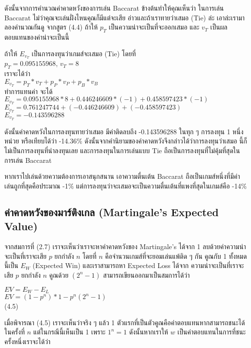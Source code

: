 \documentclass{article}
\begin{document}
ดังนั้นจากการคำนวณค่าคาดหวังของการเล่น Baccarat ข้างต้นทำให้คุณเห็นว่า ในการเล่น Baccarat ไม่ว่าคุณจะเล่นฝั่งไหนคุณก็มีแต่จะเสีย อ่าวและถ้าเราทายว่าเสมอ (Tie) ล่ะ เอาล่ะเรามาลองคำนวณกันดู จากสูตร (4.4) ถ้าให้ $p_T$ เป็นความน่าจะเป็นที่จะออกเสมอ และ $v_T$ เป็นผลตอบแทนของค่าน่าจะเป็นนี้

\begin{center}
ถ้าให้ $E_{v_T}$ เป็นการลงทุนว่าเกมส์จะเสมอ (Tie) โดยที่\\
$p_T=0.095155968$, $v_T=8$\\
เราจะได้ว่า\\
$E_{v_T}=p_T*v_T+p_P*v_P+p_B*v_B$\\
ทำการแทนค่า จะได้\\
$E_{v_T}=0.095155968*8+0.446246609*(-1)+0.458597423*(-1)$\\
$E_{v_T}=0.761247744+(-0.446246609)+(-0.458597423)$\\
$E_{v_T}=-0.143596288$\\
\end{center}

ดังนั้นค่าคาดหวังในการลงทุนทายว่าเสมอ มีค่าติดลบถึง -0.143596288 ในทุก ๆ การลงทุน 1 หนึ่งหน่วย หรือเทียบได้ว่า -14.36\% ดังนั้นจากคำนิยามของค่าคาดหวังจึงกล่าวได้ว่าการลงทุนว่าเสมอ นี้ก็ไม่เป็นการลงทุนที่น่าลงทุนเลย และการลงทุนในการเล่นแบบ Tie ถือเป็นการลงทุนที่ไม่คุ้มที่สุดในการเล่น Baccarat 

หากเราไปเล่นด้วยความต้องการเอาสนุกสนาน เอาความตื่นเต้น Baccarat ถือเป็นเกมส์หนึ่งที่มีค่าเล่นถูกที่สุดคือประมาณ -1\%  แต่การลงทุนว่าจะเสมอจะเป็นความตื่นเต้นที่แพงที่สุดในเกมส์คือ -14\%

\subsection{ค่าคาดหวังของมาร์ติงเกล (Martingale's Expected Value)}
จากสมการที่ (2.7) เราจะเห็นว่าเราจะหาค่าคาดหวังของ Martingale's ได้จาก 1 ลบด้วยค่าความน่าจะเป็นที่เราจะเสีย $p$ ยกกำลัง $n$ โดยที่ $n$ คือจำนวนเกมส์ที่จะยอมเล่นแพ้ติด ๆ กัน คูณกับ 1 ทั้งหมดนี้เป็น $E_W$ (Expected Win) และเราสามารถหา Expected Loss ได้จาก ความน่าจะเป็นที่เราจะเสีย $p$ ยกกำลัง $n$ คูณด้วย $(2^n-1)$ สามารถเขียนออกมาเป็นสมการได้ว่า

\begin{center}
$EV=E_W-E_L$\\
$EV=(1-p^n)*1 - p^n(2^n-1)$\\
(4.5)\\
\end{center}

เมื่อพิจารณา (4.5) เราจะเห็นว่าจริง ๆ แล้ว 1 ตัวแรกที่เป็นตัวคูณคือค่าตอบแทนหากสามารถชนะได้ในครั้งที่ $n$ แต่ในกรณีนี้เห็นเป็น 1 เพราะ $1^n=1$ ดังนั้นหากเราให้ $w$ เป็นค่าตอบแทนในการที่ชนะครั้งหนึ่งเราจะได้ว่า
\end{document}
